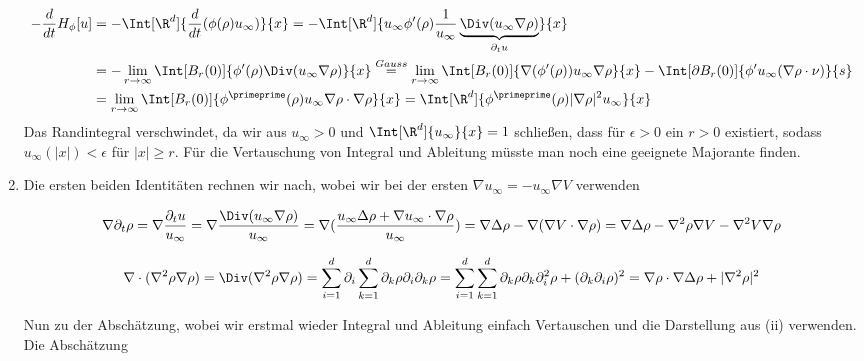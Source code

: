 \begin{solution}
\begin{enumerate}[label = (\roman*)]
  \begin{align*}
    -\frac{d}{dt} H_\phi[u]
    &=
    -\Int[\R^d]{ \frac{d}{dt}(\phi(\rho)u_\infty)}{x}
    =
    -\Int[\R^d]{u_\infty \phi^\prime(\rho)\frac{1}{u_\infty} \underbrace{\Div(u_\infty \nabla \rho)}_{\partial_t u}}{x} \\
    &=
    -\lim_{r \rightarrow \infty} \Int[B_r(0)]{\phi^\prime(\rho) \Div(u_\infty \nabla \rho)}{x}
    \stackrel{Gauss}{=}
    \lim_{r \rightarrow \infty} \Int[B_r(0)]{\nabla(\phi^\prime(\rho)) u_\infty \nabla \rho}{x}
    -
    \Int[\partial B_r(0)]{\phi^\prime u_\infty (\nabla \rho \cdot \nu)}{s} \\
    &=
    \lim_{r \rightarrow \infty} \Int[B_r(0)]{\phi^\primeprime(\rho) u_\infty \nabla \rho \cdot \nabla \rho}{x}
    =
    \Int[\R^d]{\phi^\primeprime(\rho) |\nabla \rho|^2 u_\infty}{x}
  \end{align*}
  Das Randintegral verschwindet, da wir aus $u_\infty > 0$ und $\Int[\R^d]{u_\infty}{x} = 1$ schließen, dass für $\epsilon > 0$ ein $r > 0$ existiert, sodass $u_\infty(|x|) < \epsilon$ für $|x| \geq r$. Für die Vertauschung von Integral und Ableitung müsste man noch eine geeignete Majorante finden.

  \item Die ersten beiden Identitäten rechnen wir nach, wobei wir bei der ersten $\nabla u_\infty = - u_\infty \nabla V$ verwenden

  \begin{align}\label{first}
    \nabla \partial_t \rho
    =
    \nabla \frac{\partial_t u}{u_\infty}
    =
    \nabla \frac{\Div(u_\infty \nabla \rho)}{u_\infty}
    =
    \nabla(\frac{u_\infty \Delta \rho + \nabla u_\infty \cdot \nabla \rho}{u_\infty})
    =
    \nabla \Delta \rho - \nabla (\nabla V \cdot \nabla \rho)
    =
    \nabla \Delta \rho - \nabla^2 \rho \nabla V - \nabla^2 V \nabla \rho
    \end{align}

    \begin{align}\label{second}
    \nabla \cdot (\nabla^2 \rho \nabla \rho)
    =
    \Div(\nabla^2 \rho \nabla \rho)
    =
    \sum_{i=1}^d \partial_i \sum_{k=1}^d \partial_k \rho \partial_i \partial_k \rho
    =
    \sum_{i=1}^d \sum_{k=1}^d \partial_k \rho \partial_k \partial_i^2  \rho + (\partial_k \partial_i \rho)^2
    =
    \nabla \rho \cdot \nabla \Delta \rho + |\nabla^2 \rho|^2
  \end{align}

  Nun zu der Abschätzung, wobei wir erstmal wieder Integral und Ableitung einfach Vertauschen und die Darstellung aus (ii) verwenden. Die Abschätzung


\end{enumerate}
\end{solution}
